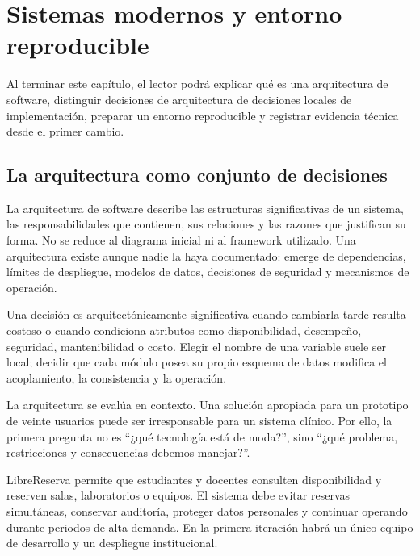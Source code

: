 \chapter{Sistemas modernos y entorno reproducible}

\begin{objetivos}
Al terminar este capítulo, el lector podrá explicar qué es una arquitectura de software, distinguir decisiones de arquitectura de decisiones locales de implementación, preparar un entorno reproducible y registrar evidencia técnica desde el primer cambio.
\end{objetivos}

\section{La arquitectura como conjunto de decisiones}
La arquitectura de software describe las estructuras significativas de un sistema, las responsabilidades que contienen, sus relaciones y las razones que justifican su forma. No se reduce al diagrama inicial ni al framework utilizado. Una arquitectura existe aunque nadie la haya documentado: emerge de dependencias, límites de despliegue, modelos de datos, decisiones de seguridad y mecanismos de operación.

Una decisión es arquitectónicamente significativa cuando cambiarla tarde resulta costoso o cuando condiciona atributos como disponibilidad, desempeño, seguridad, mantenibilidad o costo. Elegir el nombre de una variable suele ser local; decidir que cada módulo posea su propio esquema de datos modifica el acoplamiento, la consistencia y la operación.

La arquitectura se evalúa en contexto. Una solución apropiada para un prototipo de veinte usuarios puede ser irresponsable para un sistema clínico. Por ello, la primera pregunta no es ``¿qué tecnología está de moda?'', sino ``¿qué problema, restricciones y consecuencias debemos manejar?''.

\begin{caso}
LibreReserva permite que estudiantes y docentes consulten disponibilidad y reserven salas, laboratorios o equipos. El sistema debe evitar reservas simultáneas, conservar auditoría, proteger datos personales y continuar operando durante periodos de alta demanda. En la primera iteración habrá un único equipo de desarrollo y un despliegue institucional.
\end{caso}

